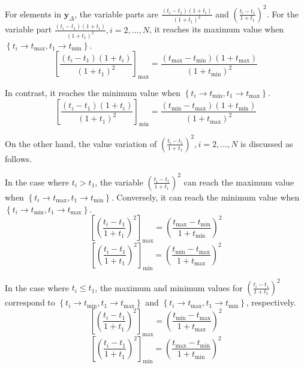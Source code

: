\documentclass[journal]{IEEEtran}
\begin{document}
For elements in $\mathbf{y}_{\Delta}$, the variable parts are ${ \frac{{\left({t_i}-{t_1}\right)\left({1+{t_i}}\right)}}{{\left(1+{t_1}\right)}^2}}$ and $\left({\frac{{t_i}-{t_1}}{1+{t_1}}}\right)^2$. For the variable part  ${ \frac{{\left({t_i}-{t_1}\right)\left({1+{t_i}}\right)}}{{\left(1+{t_1}\right)}^2}}, i = 2,...,N$, it reaches its maximum value when $\left\{{t_i}\rightarrow{t_{\max}}, {t_1}\rightarrow{t_{\min}}\right\}$.
\begin{equation}\label{eq:2.42}
\left[\frac{\left(t_i-t_1\right)\left(1+t_i\right)}{\left(1+t_1\right)^2}\right]_{\max}={\frac{{\left({t_{\max}}-{t_{\min}}\right)\left({1+{t_{\max}}}\right)}}{\left(1+{t_{\min}}\right)^2}}
\end{equation}

In contrast, it reaches the minimum value when $\left\{{t_i}\rightarrow{t_{\min}}, {t_1}\rightarrow{t_{\max}}\right\}$.
\begin{equation}\label{eq:2.43}
   \left[\frac{\left(t_i-t_1\right)\left(1+t_i\right)}{\left(1+t_1\right)^2}\right]_{\min}= {\frac{{\left({t_{\min}}-{t_{\max}}\right)\left({1+{t_{\min}}}\right)}}{\left(1+{t_{\max}}\right)^2}} 
\end{equation}

On the other hand, the value variation of $\left({\frac{{t_i}-{t_1}}{1+{t_1}}}\right)^2,i=2, ... ,N $ is discussed as follows.

In the case where ${t_i}>{t_1}$, the variable $\left({\frac{{t_i}-{t_1}}{1+{t_1}}}\right)^2$ can reach the maximum value when $\left\{{t_i}\rightarrow{t_{\max}}, {t_1}\rightarrow{t_{\min}}\right\}$. Conversely, it can reach the minimum value when $\left\{{t_i}\rightarrow{t_{\min}}, {t_1}\rightarrow{t_{\max}}\right\}$.
\begin{equation}\label{eq:2.44}
   \left[\left(\frac{t_i-t_1}{1+t_1}\right)^2\right]_{\max} = {\left({\frac{{t_{\max}}-{t_{\min}}}{1+{t_{\min}}}}\right)^2}
\end{equation}
\begin{equation}\label{eq:2.45}
   \left[\left(\frac{t_i-t_1}{1+t_1}\right)^2\right]_{\min} = {\left({\frac{{t_{\min}}-{t_{\max}}}{1+{t_{\max}}}}\right)^2}
\end{equation}

In the case where ${t_i} \leq {t_1}$, the maximum and minimum values for $\left({\frac{{t_i}-{t_1}}{1+{t_1}}}\right)^2$ correspond to $\left\{{t_i}\rightarrow{t_{\min}}, {t_1}\rightarrow{t_{\max}}\right\}$ and $\left\{{t_i}\rightarrow{t_{\max}}, {t_1}\rightarrow{t_{\min}}\right\}$, respectively.
\begin{equation}\label{eq:2.46}
   \left[\left(\frac{t_i-t_1}{1+t_1}\right)^2\right]_{\max} = {\left({\frac{{t_{\min}}-{t_{\max}}}{1+{t_{\max}}}}\right)^2}
\end{equation}
\begin{equation}\label{eq:2.47}
   \left[\left(\frac{t_i-t_1}{1+t_1}\right)^2\right]_{\min} = {\left({\frac{{t_{\max}}-{t_{\min}}}{1+{t_{\min}}}}\right)^2}
\end{equation}
\end{document}
